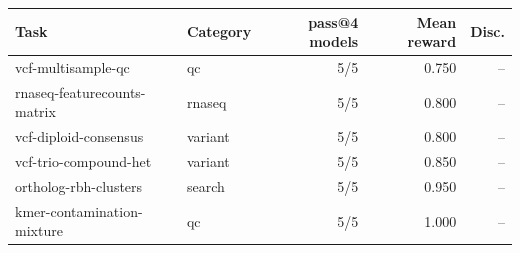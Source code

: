 \begin{tabular}{llrrr}
\toprule
Task & Category & pass@4 models & Mean reward & Disc. \\
\midrule
vcf-multisample-qc & qc & 5/5 & 0.750 & -- \\
rnaseq-featurecounts-matrix & rnaseq & 5/5 & 0.800 & -- \\
vcf-diploid-consensus & variant & 5/5 & 0.800 & -- \\
vcf-trio-compound-het & variant & 5/5 & 0.850 & -- \\
ortholog-rbh-clusters & search & 5/5 & 0.950 & -- \\
kmer-contamination-mixture & qc & 5/5 & 1.000 & -- \\
\bottomrule
\end{tabular}
